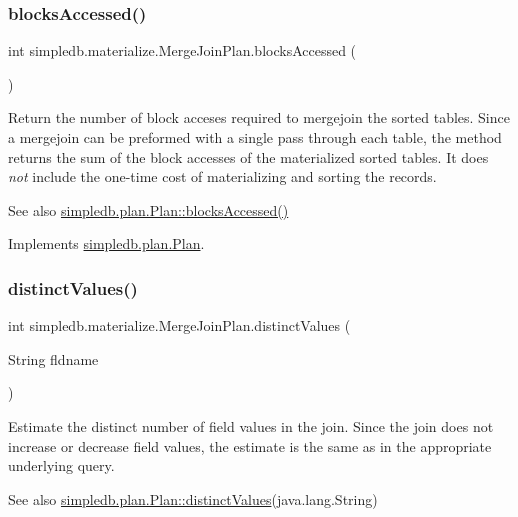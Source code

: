 \subsubsection{\texorpdfstring{blocks\+Accessed()}{blocksAccessed()}}
{\footnotesize\ttfamily int simpledb.\+materialize.\+Merge\+Join\+Plan.\+blocks\+Accessed (\begin{DoxyParamCaption}{ }\end{DoxyParamCaption})\hspace{0.3cm}{\ttfamily [inline]}}

Return the number of block acceses required to mergejoin the sorted tables. Since a mergejoin can be preformed with a single pass through each table, the method returns the sum of the block accesses of the materialized sorted tables. It does {\itshape not} include the one-\/time cost of materializing and sorting the records. \begin{DoxySeeAlso}{See also}
\hyperlink{interfacesimpledb_1_1plan_1_1Plan_a6a333b95b956fe224812155b9d1c8202}{simpledb.\+plan.\+Plan\+::blocks\+Accessed()} 
\end{DoxySeeAlso}


Implements \hyperlink{interfacesimpledb_1_1plan_1_1Plan_a6a333b95b956fe224812155b9d1c8202}{simpledb.\+plan.\+Plan}.

\mbox{\label{classsimpledb_1_1materialize_1_1MergeJoinPlan_a70b3e49e98fb23b0f99051e5f3e8af60}} 
\subsubsection{\texorpdfstring{distinct\+Values()}{distinctValues()}}
{\footnotesize\ttfamily int simpledb.\+materialize.\+Merge\+Join\+Plan.\+distinct\+Values (\begin{DoxyParamCaption}\item[{String}]{fldname }\end{DoxyParamCaption})\hspace{0.3cm}{\ttfamily [inline]}}

Estimate the distinct number of field values in the join. Since the join does not increase or decrease field values, the estimate is the same as in the appropriate underlying query. \begin{DoxySeeAlso}{See also}
\hyperlink{interfacesimpledb_1_1plan_1_1Plan_a55094c16c756b0c09b5c71b94d573271}{simpledb.\+plan.\+Plan\+::distinct\+Values}(java.\+lang.\+String) 
\end{DoxySeeAlso}


